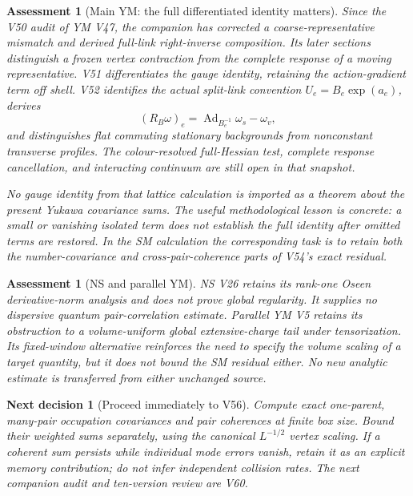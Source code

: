 \documentclass[11pt]{article}
\newtheorem{decision}[theorem]{Next decision}
\newtheorem{assessment}[theorem]{Assessment}
\theoremstyle{remark}
\begin{document}
\begin{assessment}[Main YM: the full differentiated identity matters]
\label{ass:v20v55-ym}
Since the V50 audit of YM V47, the companion has corrected a
coarse-representative mismatch and derived full-link right-inverse
composition.  Its later sections distinguish a frozen vertex
contraction from the complete response of a moving representative.
V51 differentiates the gauge identity, retaining the action-gradient
term off shell.  V52 identifies the actual split-link convention
\(U_e=B_e\exp(a_e)\), derives
\[
 (R_B\omega)_e=\operatorname{Ad}_{B_e^{-1}}\omega_s-\omega_v,
\]
and distinguishes flat commuting stationary backgrounds from
nonconstant transverse profiles.  The colour-resolved full-Hessian
test, complete response cancellation, and interacting continuum
are still open in that snapshot.

No gauge identity from that lattice calculation is imported as
a theorem about the present Yukawa covariance sums.  The useful
methodological lesson is concrete: a small or vanishing isolated
term does not establish the full identity after omitted terms
are restored.  In the SM calculation the corresponding task is
to retain both the number-covariance and cross-pair-coherence
parts of V54's exact residual.
\end{assessment}

\begin{assessment}[NS and parallel YM]
\label{ass:v20v55-other}
NS V26 retains its rank-one Oseen derivative-norm analysis and
does not prove global regularity.  It supplies no dispersive
quantum pair-correlation estimate.  Parallel YM V5 retains its
obstruction to a volume-uniform global extensive-charge tail
under tensorization.  Its fixed-window alternative reinforces
the need to specify the volume scaling of a target quantity,
but it does not bound the SM residual either.  No new analytic
estimate is transferred from either unchanged source.
\end{assessment}

\begin{decision}[Proceed immediately to V56]
\label{dec:v20v55-next}
Compute exact one-parent, many-pair occupation covariances and
pair coherences at finite box size.  Bound their weighted sums
separately, using the canonical \(L^{-1/2}\) vertex scaling.
If a coherent sum persists while individual mode errors vanish,
retain it as an explicit memory contribution; do not infer
independent collision rates.  The next companion audit and
ten-version review are V60.
\end{decision}
\end{document}
